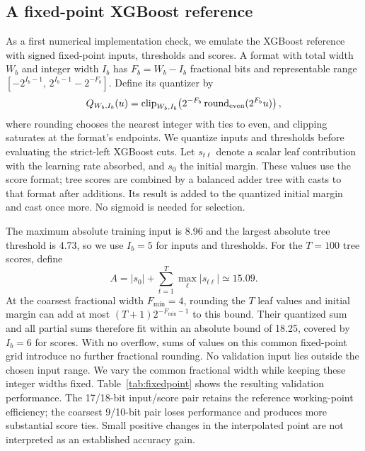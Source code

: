 \subsection{A fixed-point XGBoost reference}
\label{sec:fixedpoint}
As a first numerical implementation check, we emulate the XGBoost reference
with signed fixed-point inputs, thresholds and scores. A format with total
width $W_b$ and integer width $I_b$ has $F_b=W_b-I_b$ fractional bits and
representable range
$[-2^{I_b-1},\,2^{I_b-1}-2^{-F_b}]$. Define its quantizer by
\begin{equation}
 Q_{W_b,I_b}(u)=\operatorname{clip}_{W_b,I_b}
 \!\left(2^{-F_b}\operatorname{round}_{\rm even}(2^{F_b}u)\right),
 \label{eq:quantizer}
\end{equation}
where rounding chooses the nearest integer with ties to even, and clipping
saturates at the format's endpoints. We quantize inputs and thresholds before
evaluating the strict-left XGBoost cuts. Let $s_{t\ell}$ denote a scalar leaf contribution with the learning rate
absorbed, and $s_0$ the initial margin. These values
use the score format; tree scores are combined by a balanced adder tree with
casts to that format after additions. Its result is added to the quantized
initial margin and cast once more. No sigmoid is needed for selection.

The maximum absolute training input is 8.96 and the largest absolute tree
threshold is 4.73, so we use $I_b=5$ for inputs and thresholds. For the
$T=100$ tree scores, define
\begin{equation}
 A=|s_0|+\sum_{t=1}^{T}\max_\ell|s_{t\ell}|\simeq15.09.
 \label{eq:score-bound}
\end{equation}
At the coarsest fractional width $F_{\min}=4$, rounding the $T$ leaf values
and initial margin can add at most $(T+1)2^{-F_{\min}-1}$ to this bound.
Their quantized sum and all partial sums therefore fit within an absolute
bound of 18.25, covered by $I_b=6$ for scores. With no overflow, sums of values
on this common fixed-point grid introduce no further fractional rounding.
No validation input lies outside the chosen input range. We vary the common
fractional width while keeping these integer widths fixed. Table~\ref{tab:fixedpoint}
shows the resulting validation performance. The 17/18-bit input/score pair
retains the reference working-point efficiency; the coarsest 9/10-bit pair
loses performance and produces more substantial score ties. Small positive
changes in the interpolated point are not interpreted as an established
accuracy gain.

